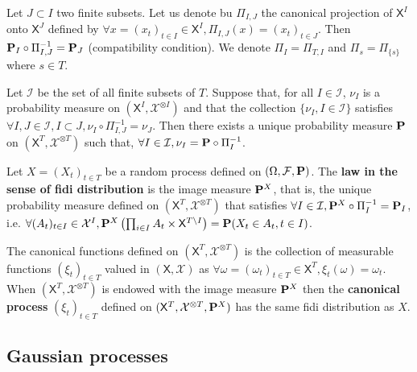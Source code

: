 	Let $J \subset I$ two finite subsets.
	Let us denote bu $\Pi_{I,J}$ the canonical projection of $\mathsf{X}^I$ onto $\mathsf{X}^J$ defined by $\forall x = (x_t)_{t \in I} \in \mathsf{X}^I, \Pi_{I,J}(x) = (x_t)_{t \in J}$.
	Then $\mathbf{P}_I \circ \Pi_{I,J}^{-1} = \mathbf{P}_J$ (compatibility condition).
	We denote $\Pi_I = \Pi_{T,I}$ and $\Pi_s = \Pi_{ \{ s \} }$ where $s \in T$.

	\begin{thm}[Kolmogorov]
		Let $\mathcal{I}$ be the set of all finite subsets of $T$.
		Suppose that, for all $I \in \mathcal{I}$, $\nu_I$ is a probability measure on $(\mathsf{X}^I,\mathcal{X}^{\otimes I})$ and that the collection $\{ \nu_I, I \in \mathcal{I} \}$ satisfies $\forall I, J \in \mathcal{I}, I \subset J, \nu_I \circ \Pi_{I,J}^{-1} = \nu_J$.
		Then there exists a unique probability measure $\mathbf{P}$ on $(\mathsf{X}^T,\mathcal{X}^{\otimes T})$ such that, $\forall I \in \mathcal{I}, \nu_I = \mathbf{P} \circ \Pi_I^{-1}$.
	\end{thm}

	\begin{defn}
		Let $X = (X_t)_{t \in T}$ be a random process defined on $(\Omega,\mathcal{F},\mathbf{P})$.
		The \textbf{law in the sense of fidi distribution} is the image measure $\mathbf{P}^X$, that is, the unique probability measure defined on $(\mathsf{X}^T,\mathcal{X}^{\otimes T})$ that satisfies $\forall I \in \mathcal{I}, \mathbf{P}^X \circ \Pi_I^{-1} = \mathbf{P}_I$, i.e. $\forall (A_t)_{t \in I} \in \mathcal{X}^I, \mathbf{P}^X \left( \prod_{i \in I} A_t \times \mathsf{X}^{T \setminus I} \right) = \mathbf{P} (X_t \in A_t, t \in I)$.
	\end{defn}
	
	\begin{defn}
		The canonical functions defined on $(\mathsf{X}^T,\mathcal{X}^{\otimes T})$ is the collection of measurable functions $(\xi_t)_{t \in T}$ valued in $(\mathsf{X},\mathcal{X})$ as $\forall  \omega = (\omega_t)_{t \in T} \in \mathsf{X}^T, \xi_t(\omega) = \omega_t$.
		When $(\mathsf{X}^T,\mathcal{X}^{\otimes T})$ is endowed with the image measure $\mathbf{P}^X$ then the \textbf{canonical process} $(\xi_t)_{t \in T}$ defined on $(\mathsf{X}^T,\mathcal{X}^{\otimes T},\mathbf{P}^X)$ has the same fidi distribution as $X$.
	\end{defn}


\subsection{Gaussian processes}

